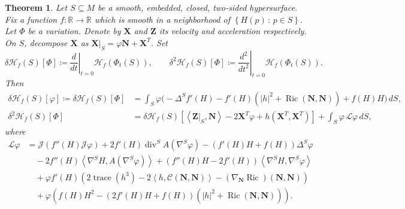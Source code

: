\documentclass[11pt]{amsart}
\newcommand{\n}[1]{\nabla^\varepsilon_{ #1 }}
\newcommand{\tmc}{{\mathscr{H}}}
\newcommand{\rr}{{\mathbb{R}}}
\renewcommand{\j}{\mathcal{C}}
\newcommand{\X}{\mathbf{X}}
\newcommand{\Z}{\mathbf{Z}}
\renewcommand{\n}{\mathbf{N}}
\DeclareMathOperator{\ric}{Ric}
\DeclareMathOperator{\divv}{div}
\DeclareMathOperator{\trace}{trace}
\newcommand{\jacobi}{\mathcal{J}}
\newtheorem{theorem}{Theorem}[section]
\theoremstyle{definition}
\theoremstyle{remark}
\numberwithin{equation}{section}
\begin{document}
\begin{theorem}\label{maintheoremappendixA}
    Let $S\subseteq M$ be a smooth, embedded, closed, two-sided hypersurface. Fix a function $f:\rr\to\rr$ which is smooth in a neighborhood of $\left\{H(p)\,:\,p\in S\right\}$. Let $\Phi$ be a variation. Denote by $\X$ and $\Z$ its velocity and acceleration respectively. On $S$, decompose $\X$ as $\X|_S=\varphi \n+\X^T$. Set 
        \begin{equation*}
 \delta\tmc_f(S)[\Phi]\coloneqq \left.\frac{d}{d t}\right|_{t=0}\tmc_f\left(\Phi_t(S)\right),\qquad   \delta^2\tmc_f(S)[\Phi]\coloneqq \left.\frac{d^2}{dt^2}\right|_{t=0}\tmc_f\left(\Phi_t(S)\right).
\end{equation*}     
    Then 
    \begin{align}
        \delta\tmc_f(S)[\varphi]\coloneqq  \delta\tmc_f(S)[\Phi]&=\int_S\varphi\Big(-\Delta^S f'(H)-f'(H)\left(|h|^2+\ric(\n,\n)\right)+ f(H) H\Big)\,dS,\label{primavarfunzgen}\\
        \delta^2\tmc_f(S)[\Phi]&=\delta\tmc_f(S)\left[\left\langle\Z|_S,\n\right\rangle-2\X^T\varphi+h\left(\X^T,\X^T\right)\right]+\int_S\varphi\,\mathcal L\varphi\,dS\label{variazsecondanormalemaarbitrariaperilresto},
    \end{align}
    where
    \begin{equation*}
        \begin{split}
            \mathcal L\varphi&=\jacobi\left(f''(H)\jacobi\varphi\right)+2f'(H)\divv^S A\left(\nabla^S\varphi\right)-\left(f'(H)H+f(H)\right)\Delta^S\varphi\\
            &\quad-2 f''(H)\left\langle\nabla^S H,A\left(\nabla^S\varphi\right)\right\rangle+\left(f''(H)H-2f'(H)\right)\left\langle \nabla^S H,\nabla^S\varphi\right\rangle\\
            &\quad+\varphi f'(H)\left(2\trace\left(h^3\right)-2\left\langle h,\j(\n,\n)\right\rangle-\left(\nabla_\n \ric\right)(\n,\n)\right)\\
            &\quad+\varphi \left ( f(H)H^2-\left(2f'(H) H+f(H)\right)\left(|h|^2+ \ric(\n,\n)\right)\right).
        \end{split}
    \end{equation*}
\end{theorem}
\end{document}
